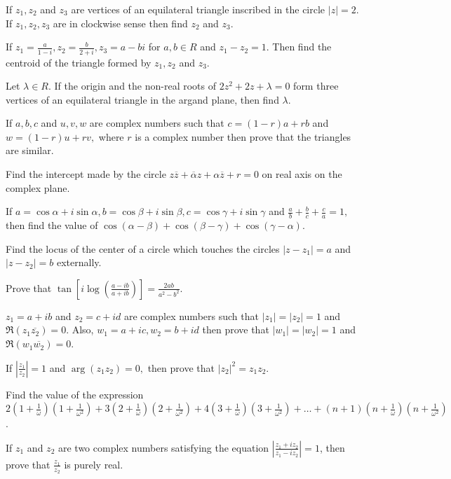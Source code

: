 \item If $z_1, z_2$ and $z_3$ are vertices of an equilateral triangle inscribed in the circle $|z| = 2.$ If $z_1, z_2,
  z_3$ are in clockwise sense then find $z_2$ and $z_3$.
\item If $z_1 = \frac{a}{1 - i}, z_2 = \frac{b}{2 + i}, z_3 = a - bi$ for $a, b\in R$ and $z_1 - z_2 = 1.$ Then find the
  centroid of the triangle formed by $z_1, z_2$ and $z_3$.
\item Let $\lambda \in R$. If the origin and the non-real roots of $2z^2 + 2z + \lambda = 0$ form three vertices of an
  equilateral triangle in the argand plane, then find $\lambda.$
\item If $a, b, c$ and $u, v, w$ are complex numbers such that $c = (1 - r)a + rb$ and $w = (1 - r)u + rv,$ where $r$ is
  a complex number then prove that the triangles are similar.
\item Find the intercept made by the circle $z\overline{z} + \overline{\alpha}z + \alpha\overline{z} + r = 0$ on real
  axis on the complex plane.
\item If $a = \cos\alpha +i\sin\alpha, b = \cos\beta + i\sin\beta, c = \cos\gamma + i\sin\gamma$ and $\frac{a}{b} +
  \frac{b}{c} + \frac{c}{a} = 1,$ then find the value of $\cos(\alpha - \beta) + \cos(\beta - \gamma) + \cos(\gamma - \alpha)$.
\item Find the locus of the center of a circle which touches the circles $|z - z_1| = a$ and $|z - z_2| = b$ externally.
\item Prove that $\tan\left[i\log\left(\frac{a - ib}{a + ib}\right)\right] = \frac{2ab}{a^2 - b^2}$.
\item $z_1 = a + ib$ and $z_2 = c + id$ are complex numbers such that $|z_1| = |z_2| = 1$ and $\Re(z_1\overline{z_2}) =
  0.$ Also, $w_1 = a + ic, w_2 = b + id$ then prove that $|w_1| = |w_2| = 1$ and $\Re(w_1\overline{w_2}) = 0$.
\item If $\left|\frac{z_1}{z_2}\right| = 1$ and $\arg(z_1z_2) = 0,$ then prove that $|z_2|^2 = z_1z_2$.
\item Find the value of the expression $2\left(1 + \frac{1}{\omega}\right)\left(1 + \frac{1}{\omega^2}\right) + 3\left(2
  + \frac{1}{\omega}\right)\left(2 + \frac{1}{\omega^2}\right) + 4\left(3 + \frac{1}{\omega}\right) \left(3 +
  \frac{1}{\omega^2}\right) + \ldots + (n + 1)\left(n + \frac{1}{\omega}\right)\left(n + \frac{1}{\omega^2}\right)$.
\item If $z_1$ and $z_2$ are two complex numbers satisfying the equation $\left|\frac{z_1 + iz_2}{z_1 -
  iz_2}\right| = 1$, then prove that $\frac{z_1}{z_2}$ is purely real.
